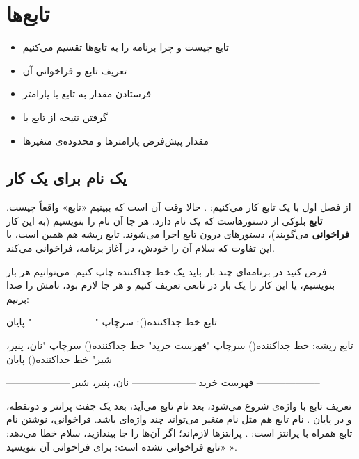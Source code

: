 \chapter{تابع‌ها}\label{ch:functions}

\begin{goals}
\begin{itemize}
  \item تابع چیست و چرا برنامه را به تابع‌ها تقسیم می‌کنیم
  \item تعریف تابع و فراخوانی آن
  \item فرستادن مقدار به تابع با پارامتر
  \item گرفتن نتیجه از تابع با 
  \item مقدار پیش‌فرض پارامترها و محدوده‌ی متغیرها
\end{itemize}
\end{goals}

\section{یک نام برای یک کار}

از فصل اول با یک تابع کار می‌کنیم: . حالا وقت آن است که
ببینیم «تابع» واقعاً چیست. \textbf{تابع} بلوکی از دستورهاست که یک نام
دارد. هر جا آن نام را بنویسیم (به این کار \textbf{فراخوانی} می‌گویند)،
دستورهای درون تابع اجرا می‌شوند. تابع ریشه هم همین است، با این تفاوت که
سلام آن را خودش، در آغاز برنامه، فراخوانی می‌کند.

فرض کنید در برنامه‌ای چند بار باید یک خط جداکننده چاپ کنیم. می‌توانیم هر
بار \mbox{} بنویسیم، یا این کار را یک بار در
تابعی تعریف کنیم و هر جا لازم بود، نامش را صدا بزنیم:

\begin{salamfa}
تابع خط جداکننده():
    سرچاپ "--------------------"
پایان

تابع ریشه:
    خط جداکننده()
    سرچاپ "فهرست خرید"
    خط جداکننده()
    سرچاپ "نان، پنیر، شیر"
    خط جداکننده()
پایان
\end{salamfa}

\begin{outputfa}
--------------------
فهرست خرید
--------------------
نان، پنیر، شیر
--------------------
\end{outputfa}

تعریف تابع با واژه‌ی  شروع می‌شود، بعد نام تابع می‌آید، بعد یک
جفت پرانتز و دونقطه، و در پایان . نام تابع هم مثل نام متغیر
می‌تواند چند واژه‌ای باشد. فراخوانی، نوشتن نام تابع همراه با پرانتز است:
. پرانتزها لازم‌اند؛ اگر آن‌ها را جا بیندازید، سلام خطا
می‌دهد: «تابع  فراخوانی نشده است: برای فراخوانی آن بنویسید
».


